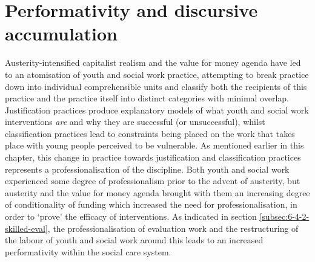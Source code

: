 \section{Performativity and discursive accumulation}
\label{sec: 6-7-performativity}
Austerity-intensified capitalist realism and the value for money agenda have led to an atomisation of youth and social work practice, attempting to break practice down into individual comprehensible units and classify both the recipients of this practice and the practice itself into distinct categories with minimal overlap. Justification practices produce explanatory models of what youth and social work interventions \emph{are} and why they are successful (or unsuccessful), whilst classification practices lead to constraints being placed on the work that takes place with young people perceived to be vulnerable. As mentioned earlier in this chapter, this change in practice towards justification and classification practices represents a professionalisation of the discipline. Both youth and social work experienced some degree of professionalism prior to the advent of austerity, but austerity and the value for money agenda brought with them an increasing degree of conditionality of funding which increased the need for professionalisation, in order to `prove' the efficacy of interventions. As indicated in section \ref{subsec:6-4-2-skilled-eval}, the professionalisation of evaluation work and the restructuring of the labour of youth and social work around this leads to an increased performativity within the social care system. 

